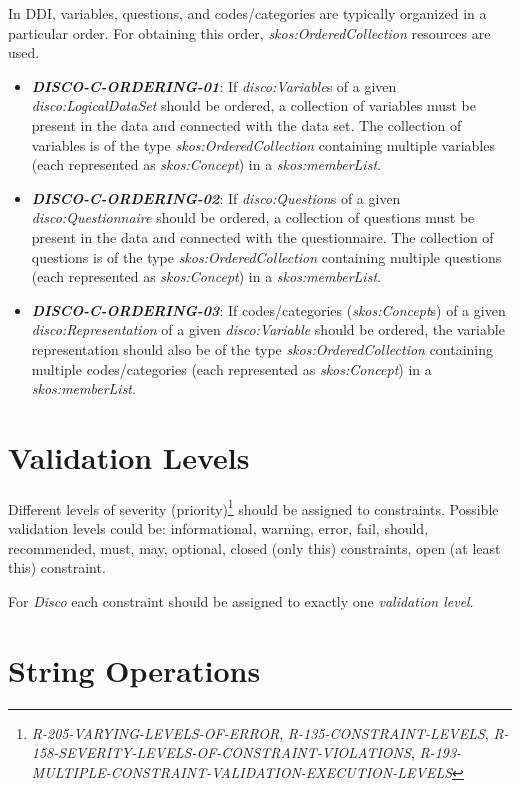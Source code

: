 \documentclass{llncs}
\begin{document}
In DDI, variables, questions, and codes/categories are typically organized in a particular order. 
For obtaining this order, {\em skos:OrderedCollection} resources are used. 

\begin{itemize}
	\item \textbf{{\em DISCO-C-ORDERING-01}}: If \emph{disco:Variable}s of a given \emph{disco:LogicalDataSet} should be ordered, a collection of variables must be present in the data and connected with the data set. The collection of variables is of the type {\em skos:OrderedCollection} containing multiple variables (each represented as {\em skos:Concept}) in a {\em skos:memberList}. 
	\item \textbf{{\em DISCO-C-ORDERING-02}}: If \emph{disco:Question}s of a given \emph{disco:Questionnaire} should be ordered, a collection of questions must be present in the data and connected with the questionnaire. The collection of questions is of the type {\em skos:OrderedCollection} containing multiple questions (each represented as {\em skos:Concept}) in a {\em skos:memberList}. 
	\item \textbf{{\em DISCO-C-ORDERING-03}}: If codes/categories (\emph{skos:Concept}s) of a given \emph{disco:Representation} of a given \emph{disco:Variable} should be ordered, the variable representation should also be of the type {\em skos:OrderedCollection} containing multiple codes/categories (each represented as {\em skos:Concept}) in a {\em skos:memberList}. 
\end{itemize}

\section{Validation Levels}

Different levels of severity (priority)\footnote{\emph{R-205-VARYING-LEVELS-OF-ERROR}, \emph{R-135-CONSTRAINT-LEVELS}, \emph{R-158-SEVERITY-LEVELS-OF-CONSTRAINT-VIOLATIONS}, \emph{R-193-MULTIPLE-CONSTRAINT-VALIDATION-EXECUTION-LEVELS}} should be assigned to constraints.
Possible validation levels could be: informational, warning, error, fail, should, recommended, must, may, optional, closed (only this) constraints, open (at least this) constraint.

For \emph{Disco} each constraint should be assigned to exactly one \emph{validation level}.

\section{String Operations}
\end{document}
